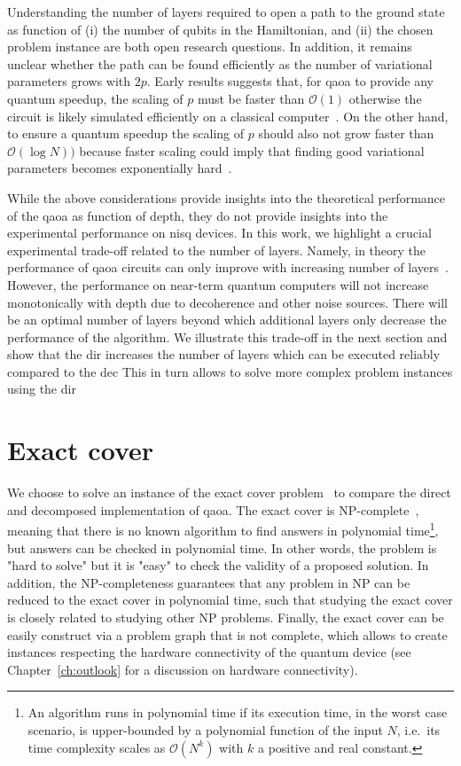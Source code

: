Understanding the number of layers required to open a path to the ground state as function of (i) the number of qubits in the Hamiltonian, and (ii) the chosen problem instance are both open research questions. In addition, it remains unclear whether the path can be found efficiently as the number of variational parameters grows with $2p$. Early results suggests that, for \gls{qaoa} to provide any quantum speedup, the scaling of $p$ must be faster than $\mathcal{O}(1)$ otherwise the circuit is likely simulated efficiently on a classical computer~\cite{Bravyi2019ObstaclesProtection}. On the other hand, to ensure a quantum speedup the scaling of $p$ should also not grow faster than $\mathcal{O}(\log N))$ because faster scaling could imply that finding good variational parameters becomes exponentially hard~\cite{Cerezo2020Cost-Function-DependentNetworks}. 

While the above considerations provide insights into the theoretical performance of the \gls{qaoa} as function of depth, they do not provide insights into the experimental performance on \gls{nisq} devices. In this work, we highlight a crucial experimental trade-off related to the number of layers. Namely, in theory the performance of \gls{qaoa} circuits can only improve with increasing number of layers~\cite{ZhouQuantumDevices}. However, the performance on near-term quantum computers will not increase monotonically with depth due to decoherence and other noise sources. There will be an optimal number of layers beyond which additional layers only decrease the performance of the algorithm. We illustrate this trade-off in the next section and show that the \gls{dir} increases the number of layers which can be executed reliably compared to the \gls{dec}
This in turn allows to solve more complex problem instances using the \gls{dir}

\section{Exact cover} \label{sec:qaoa_exact_cover}
We choose to solve an instance of the exact cover problem~\cite{Karp1972ReducibilityProblems} to compare the direct and decomposed implementation of \gls{qaoa}. The exact cover is NP-complete~\cite{GareyM1990}, meaning that there is no known algorithm to find answers in polynomial time\footnote{An algorithm runs in polynomial time if its execution time, in the worst case scenario, is upper-bounded by a polynomial function of the input $N$, i.e.\ its time complexity scales as $\mathcal{O}(N^k)$ with $k$ a positive and real constant.}, but answers can be checked in polynomial time. In other words, the problem is "hard to solve" but it is "easy" to check the validity of a proposed solution. In addition, the NP-completeness guarantees that any problem in NP can be reduced to the exact cover in polynomial time, such that studying the exact cover is closely related to studying other NP problems. Finally, the exact cover can be easily construct via a problem graph that is not complete, which allows to create instances respecting the hardware connectivity of the quantum device (see Chapter~\ref{ch:outlook} for a discussion on hardware connectivity).

